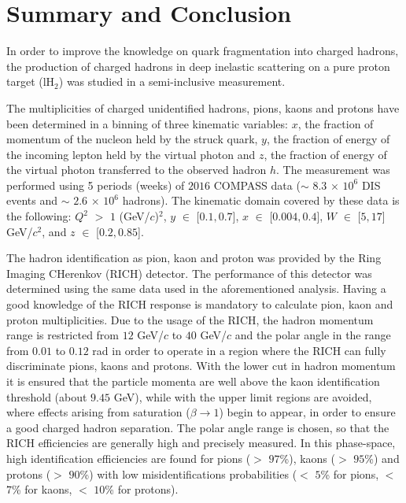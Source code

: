 
\chapter{Summary and Conclusion} %

\label{ch:CCL} %


In order to improve the knowledge on quark fragmentation into charged hadrons, the production of charged hadrons in deep inelastic scattering on a pure proton target (lH$_2$) was studied in a semi-inclusive measurement.

The multiplicities of charged unidentified hadrons, pions, kaons and protons have been determined in a binning of three kinematic variables: $x$, the fraction of momentum of the nucleon held by the struck quark, $y$, the fraction of energy of the incoming lepton held by the virtual photon and $z$, the fraction of energy of the virtual photon transferred to the observed hadron $h$. The measurement was performed using 5 periods (weeks) of $2016$ COMPASS data ($\sim$ $8.3$ $\times$ $10^6$ DIS events and $\sim$ $2.6$ $\times$ $10^6$ hadrons). The kinematic domain covered by these data is the following: $Q^2$ $>$ $1$ (GeV/$c$)$^2$, $y$ $\in$ [$0.1,0.7$], $x$ $\in$ [$0.004,0.4$], $W$ $\in$ [$5,17$] GeV/$c^2$, and $z$ $\in$ [$0.2,0.85$].

The hadron identification as pion, kaon and proton was provided by the Ring Imaging CHerenkov (RICH) detector. The performance of this detector was determined using the same data used in the aforementioned analysis. Having a good knowledge of the RICH response is mandatory to calculate pion, kaon and proton multiplicities. Due to the usage of the RICH, the hadron momentum range is restricted from $12$ GeV/$c$ to $40$ GeV/$c$ and the polar angle in the range from $0.01$ to $0.12$ rad in order to operate in a region where the RICH can fully discriminate pions, kaons and protons. With the lower cut in hadron momentum it is ensured that the particle momenta are well above the kaon identification threshold (about $9.45$ GeV), while with the upper limit regions are avoided, where effects arising from saturation ($\beta \rightarrow 1$) begin to appear, in order to ensure a good charged hadron separation. The polar angle range is chosen, so that the RICH efficiencies are generally high and precisely measured. In this phase-space, high identification efficiencies are found for pions ($>$ $97$\%), kaons ($>$ $95$\%) and protons ($>$ $90$\%) with low misidentifications probabilities ($<$ $5$\% for pions, $<$ $7$\% for kaons, $<$ $10$\% for protons).

